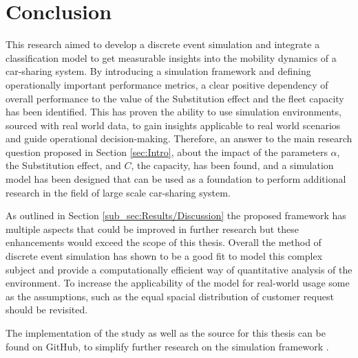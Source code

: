 \section{Conclusion}
\label{sec:Conclusion}

This research aimed to develop a discrete event simulation and integrate a classification model
to get measurable insights into the mobility dynamics of a car-sharing system. By introducing a
simulation framework and defining operationally important performance metrics, a clear
positive dependency of overall performance to the value of the Substitution effect and the
fleet capacity has been identified. This has proven the ability to use simulation environments, 
sourced with real world data, to gain insights applicable to real world scenarios and guide
operational decision-making. Therefore, an answer to the main research question proposed in Section \ref{sec:Intro},
about the impact of the parameters $\alpha$, the Substitution effect, and $C$, the capacity,
has been found, and a simulation model has been designed 
that can be used as a foundation to perform additional research in the field of large
scale car-sharing system.

As outlined in Section \ref{sub_sec:Results/Discussion} the
proposed framework has multiple aspects that could be improved in further research but these
enhancements would
exceed the scope of this thesis. Overall the method of discrete event simulation has shown to be a
good fit to model this complex subject and provide a computationally efficient way of
quantitative analysis of the environment. To increase the applicability of the model for real-world
usage some as the assumptions, such as the equal spacial distribution of customer request should be
revisited.

The implementation of the study as well as the source for this thesis can be found on GitHub, to 
simplify further research on the simulation framework .